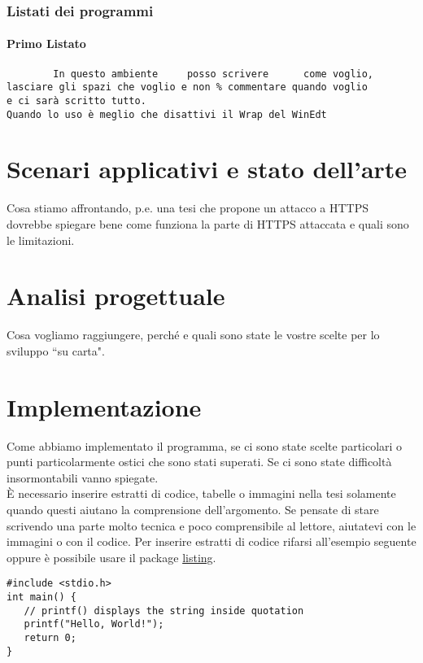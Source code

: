 \documentclass[12pt,a4paper,openright,twoside]{report}
\begin{document}
\subsection{Listati dei programmi}
\subsubsection{Primo Listato}
\begin{verbatim}
        In questo ambiente     posso scrivere      come voglio,
lasciare gli spazi che voglio e non % commentare quando voglio
e ci sarà scritto tutto.
Quando lo uso è meglio che disattivi il Wrap del WinEdt
\end{verbatim}
\clearpage{\pagestyle{empty}\cleardoublepage}



\chapter{Scenari applicativi e stato dell'arte}
Cosa stiamo affrontando, p.e. una tesi che propone un attacco a HTTPS dovrebbe spiegare bene come funziona la parte di HTTPS attaccata e quali sono le limitazioni.


\clearpage{\pagestyle{empty}\cleardoublepage}



\chapter{Analisi progettuale}
Cosa vogliamo raggiungere, perch\'e e quali sono state le vostre scelte per lo sviluppo ``su carta".


\clearpage{\pagestyle{empty}\cleardoublepage}



\chapter{Implementazione}
Come abbiamo implementato il programma, se ci sono state scelte particolari o punti particolarmente ostici che sono stati superati. Se ci sono state difficolt\`a insormontabili vanno spiegate.\\
\`E necessario inserire estratti di codice, tabelle o immagini nella tesi solamente quando questi aiutano la comprensione dell'argomento. Se pensate di stare scrivendo una parte molto tecnica e poco comprensibile al lettore, aiutatevi con le immagini o con il codice. Per inserire estratti di codice rifarsi all'esempio seguente oppure \`e possibile usare il package  \href{https://www.overleaf.com/learn/latex/Code\_listing}{listing}.
\begin{verbatim}
#include <stdio.h>
int main() {
   // printf() displays the string inside quotation
   printf("Hello, World!");
   return 0;
}
\end{verbatim}
\end{document}
